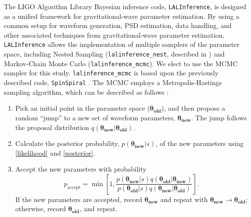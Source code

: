 \documentclass[11pt,a4paper]{emulateapj} 
\begin{document}
The LIGO Algorithm Library Bayesian inference code,
\texttt{LALInference}, is designed as a unified framework for
gravitational-wave parameter estimation.  By using a common setup for
waveform generation, PSD estimation, data handling, and other
associated techniques from gravitational-wave parameter estimation,
\texttt{LALInference} allows the implementation of multiple samplers
of the parameter space, including Nested Sampling
(\texttt{lalinference\_nest}, described in \cite{nestedsampling2010})
and Markov-Chain Monte Carlo (\texttt{lalinference\_mcmc}).  We elect
to use the MCMC sampler for this study.  \texttt{lalinference\_mcmc}
is based upon the previously described code, \texttt{SpinSpiral}
\citep{spinspiral2009, spinspiral2010}.  The MCMC employs a
Metropolis-Hastings sampling algorithm, which can be described as
follows \citep{Gilks99}:
  
\begin{enumerate}
\item Pick an initial point in the parameter space
  ($\boldsymbol{\theta_{\text{old}}}$), and then propose a random
  ``jump'' to a new set of waveform parameters,
  $\boldsymbol{\theta_{\text{new}}}$.  The jump follows the
  proposal distribution $q\left(
  \boldsymbol{\theta_{\text{new}}} | \boldsymbol{\theta_{\text{old}}}
  \right)$.
\item Calculate the posterior probability,
  $p(\boldsymbol{\theta_{\text{new}}}|s)$, of the new parameters using
  \eqref{likelihood} and \eqref{posterior}.
\item Accept the new parameters with probability
  \begin{equation}
    p_\mathrm{accept} = \min \left[ 1,
      \frac{p(\boldsymbol{\theta_{\text{new}}}|s)
        q\left(\boldsymbol{\theta_{\text{old}}} |
        \boldsymbol{\theta_{\text{new}}}
        \right)}{p(\boldsymbol{\theta_{\text{old}}}|s)
        q\left(\boldsymbol{\theta_{\text{new}}} |
        \boldsymbol{\theta_{\text{old}}} \right)} \right].
  \end{equation}
  If the new parameters are accepted, record
  $\boldsymbol{\theta_\text{new}}$ and repeat with
  $\boldsymbol{\theta_\text{new}} \rightarrow
  \boldsymbol{\theta_\text{old}}$; otherwise, record
  $\boldsymbol{\theta_\text{old}}$, and repeat.
\end{enumerate} 
  
\end{document}
